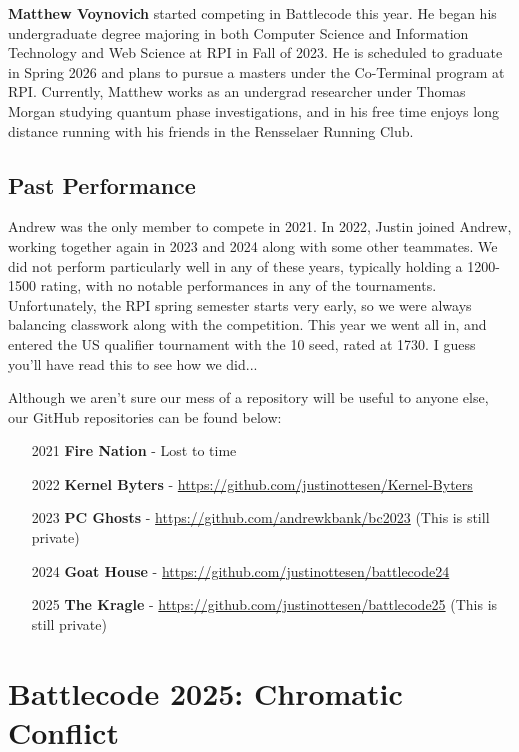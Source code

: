 \documentclass{article}
\begin{document}
  \medskip

  \textbf{Matthew Voynovich} started competing in Battlecode this year. He began his undergraduate degree majoring in both Computer Science and Information Technology and Web Science at RPI in Fall of 2023. He is scheduled to graduate in Spring 2026 and plans to pursue a masters under the Co-Terminal program at RPI. Currently, Matthew works as an undergrad researcher under Thomas Morgan studying quantum phase investigations, and in his free time enjoys long distance running with his friends in the Rensselaer Running Club.

  \subsection{Past Performance}

  Andrew was the only member to compete in 2021. In 2022, Justin joined Andrew, working together again in 2023 and 2024 along with some other teammates. We did not perform particularly well in any of these years, typically holding a 1200-1500 rating, with no notable performances in any of the tournaments. Unfortunately, the RPI spring semester starts very early, so we were always balancing classwork along with the competition. This year we went all in, and entered the US qualifier tournament with the 10 seed, rated at 1730. I guess you'll have read this to see how we did...

  \medskip

  Although we aren't sure our mess of a repository will be useful to anyone else, our GitHub repositories can be found below:
  \begin{enumerate}
    \item[2021] \textbf{Fire Nation} - Lost to time
    \item[2022] \textbf{Kernel Byters} - \url{https://github.com/justinottesen/Kernel-Byters}
    \item[2023] \textbf{PC Ghosts} - \url{https://github.com/andrewkbank/bc2023} (This is still private)
    \item[2024] \textbf{Goat House} - \url{https://github.com/justinottesen/battlecode24}
    \item[2025] \textbf{The Kragle} - \url{https://github.com/justinottesen/battlecode25} (This is still private)
  \end{enumerate}

  \section{Battlecode 2025: Chromatic Conflict}
\end{document}
